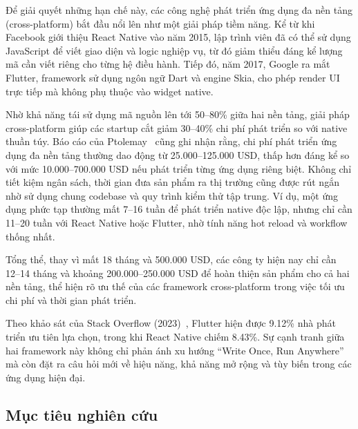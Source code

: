     Để giải quyết những hạn chế này, các công nghệ phát triển ứng dụng đa nền tảng (cross-platform) bắt đầu nổi lên như một giải pháp tiềm năng. Kể từ khi Facebook giới thiệu React Native vào năm 2015, lập trình viên đã có thể sử dụng JavaScript để viết giao diện và logic nghiệp vụ, từ đó giảm thiểu đáng kể lượng mã cần viết riêng cho từng hệ điều hành. Tiếp đó, năm 2017, Google ra mắt Flutter, framework sử dụng ngôn ngữ Dart và engine Skia, cho phép render UI trực tiếp mà không phụ thuộc vào widget native.
\vspace{0.5em}


    Nhờ khả năng tái sử dụng mã nguồn lên tới 50--80\% giữa hai nền tảng, giải pháp cross-platform giúp các startup cắt giảm 30--40\% chi phí phát triển so với native thuần túy. Báo cáo của Ptolemay~\cite{cleveroad} cũng ghi nhận rằng, chi phí phát triển ứng dụng đa nền tảng thường dao động từ 25.000--125.000 USD, thấp hơn đáng kể so với mức 10.000--700.000 USD nếu phát triển từng ứng dụng riêng biệt. Không chỉ tiết kiệm ngân sách, thời gian đưa sản phẩm ra thị trường cũng được rút ngắn nhờ sử dụng chung codebase và quy trình kiểm thử tập trung. Ví dụ, một ứng dụng phức tạp thường mất 7--16 tuần để phát triển native độc lập, nhưng chỉ cần 11--20 tuần với React Native hoặc Flutter, nhờ tính năng hot reload và workflow thống nhất.
\vspace{0.5em}


    Tổng thể, thay vì mất 18 tháng và 500.000 USD, các công ty hiện nay chỉ cần 12--14 tháng và khoảng 200.000--250.000 USD để hoàn thiện sản phẩm cho cả hai nền tảng, thể hiện rõ ưu thế của các framework cross-platform trong việc tối ưu chi phí và thời gian phát triển.
\vspace{0.5em}


    Theo khảo sát của Stack Overflow (2023)~\cite{stackoverflow2023}, Flutter hiện được 9.12\% nhà phát triển ưu tiên lựa chọn, trong khi React Native chiếm 8.43\%. Sự cạnh tranh giữa hai framework này không chỉ phản ánh xu hướng ``Write Once, Run Anywhere'' mà còn đặt ra câu hỏi mới về hiệu năng, khả năng mở rộng và tùy biến trong các ứng dụng hiện đại.


\subsection{Mục tiêu nghiên cứu}
\renewcommand{\labelitemi}{--}    


